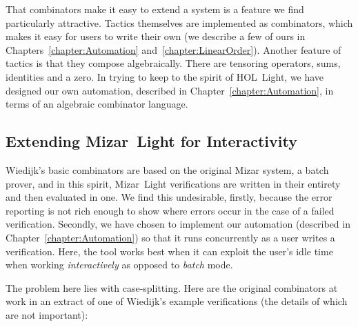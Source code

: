That combinators make it easy to extend a system is a feature we find particularly attractive. Tactics themselves are implemented as combinators, which makes it easy for users to write their own (we describe a few of ours in Chapters~\ref{chapter:Automation} and~\ref{chapter:LinearOrder}). Another feature of tactics is that they compose algebraically. There are tensoring operators, sums, identities and a zero. In trying to keep to the spirit of HOL~Light, we have designed our own automation, described in Chapter~\ref{chapter:Automation}, in terms of an algebraic combinator language.

\subsection{Extending Mizar~Light for Interactivity}\label{sec:MizarLightExtend}
Wiedijk's basic combinators are based on the original Mizar system, a batch prover, and in this spirit,  Mizar~Light verifications are written in their entirety and then evaluated in one. We find this undesirable, firstly, because the error reporting is not rich enough to show where errors occur in the case of a failed verification. Secondly, we have chosen to implement our automation (described in Chapter~\ref{chapter:Automation}) so that it runs concurrently as a user writes a verification. Here, the tool works best when it can exploit the user's idle time when working \emph{interactively} as opposed to \emph{batch} mode.

The problem here lies with case-splitting. Here are the original combinators at work in an extract of one of Wiedijk's example verifications (the details of which are not important):

\vspace{0.5cm}
\begin{minipage}{\linewidth}
  \footnotesize



  \code{\enspace [fix ["p1:Point"; "p2:Point"];}


  \code{\quad\enspace[[suppose "p1 = p2";}

  \code{\qquad\enspace qed from [0] by [LEMMA1]];}

  \code{\qquad [suppose "$\neg$(p1 = p2)";}

  \code{\qquad\enspace qed from [1]]]];}

\end{minipage}
\vspace{0.5cm}

